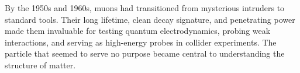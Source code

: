 \begin{historical}
By the 1950s and 1960s, muons had transitioned from mysterious intruders to standard tools. Their long lifetime, clean decay signature, and penetrating power made them invaluable for testing quantum electrodynamics, probing weak interactions, and serving as high-energy probes in collider experiments. The particle that seemed to serve no purpose became central to understanding the structure of matter.
\end{historical}
